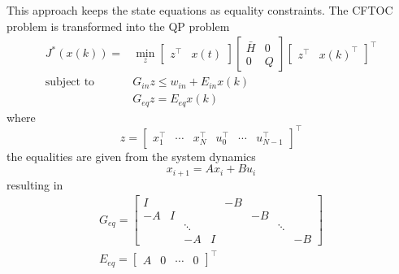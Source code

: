 This approach keeps the state equations as equality constraints. The CFTOC problem is transformed into the QP problem
\begin{align*}
    J^*(x(k)) =            & \min_{z}\begin{bmatrix}
                                         z^\top & x(t)
                                     \end{bmatrix}
    \begin{bmatrix}
        \bar{H} & 0 \\
        0       & Q
    \end{bmatrix}
    \begin{bmatrix}
        z^\top & {x(k)}^\top
    \end{bmatrix}^\top                                       \\
    \text{subject to}\quad & G_{in} z \leq w_{in} +E_{in} x(k) \\
                           & G_{eq} z = E_{eq} x(k)
\end{align*}
where
\begin{equation*}
    z = \begin{bmatrix}
        x_1^\top & \cdots & x_N^\top & u_0^\top & \cdots & u_{N-1}^\top
    \end{bmatrix}^\top
\end{equation*}
the equalities are given from the system dynamics
\begin{equation*}
    x_{i+1} = Ax_i + Bu_i
\end{equation*}
resulting in
\begin{gather*}
    G_{eq} = \left[
        \begin{array}{cccc|cccc} %
            I  &   &        &   & -B &    &        &    \\
            -A & I &        &   &    & -B &        &    \\
               &   & \ddots &   &    &    & \ddots &    \\
               &   & -A     & I &    &    &        & -B
        \end{array}
        \right] \\
    E_{eq} = \begin{bmatrix}
        A & 0 & \cdots & 0
    \end{bmatrix}^\top
\end{gather*}

